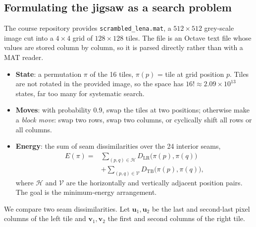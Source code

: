 \documentclass[journal]{IEEEtran}
\newcommand{\st}[1]{\texttt{#1}}
\begin{document}
\subsection{Formulating the jigsaw as a search problem}
The course repository \cite{cs605repo} provides \st{scrambled\_lena.mat}, a $512\times512$
grey-scale image cut into a $4\times4$ grid of $128\times128$ tiles. The file is an Octave text
file whose values are stored column by column, so it is parsed directly rather than with a MAT
reader.
\begin{itemize}
\item \textbf{State}: a permutation $\pi$ of the 16 tiles, $\pi(p)$ = tile at grid position $p$.
Tiles are not rotated in the provided image, so the space has $16!\approx2.09\times10^{13}$
states, far too many for systematic search.
\item \textbf{Moves}: with probability 0.9, swap the tiles at two positions; otherwise make a
\emph{block move}: swap two rows, swap two columns, or cyclically shift all rows or all columns.
\item \textbf{Energy}: the sum of seam dissimilarities over the 24 interior seams,
\begin{equation}
\begin{split}
E(\pi) = &\sum_{(p,q)\in\mathcal{H}} D_{\mathrm{LR}}\bigl(\pi(p),\pi(q)\bigr)\\
       &+ \sum_{(p,q)\in\mathcal{V}} D_{\mathrm{TB}}\bigl(\pi(p),\pi(q)\bigr),
\end{split}
\end{equation}
where $\mathcal{H}$ and $\mathcal{V}$ are the horizontally and vertically adjacent position
pairs. The goal is the minimum-energy arrangement.
\end{itemize}
We compare two seam dissimilarities. Let $\mathbf{u}_1,\mathbf{u}_2$ be the last and second-last
pixel columns of the left tile and $\mathbf{v}_1,\mathbf{v}_2$ the first and second columns of
the right tile.
\end{document}
